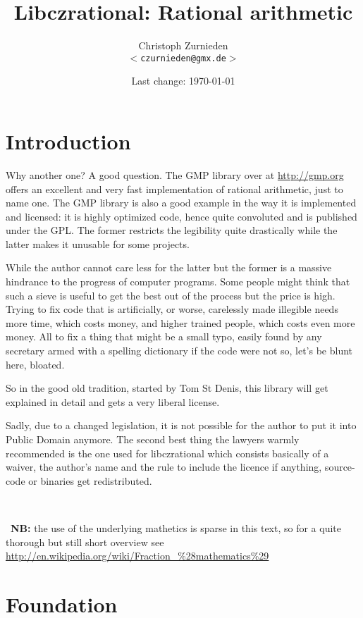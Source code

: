 \documentclass[10pt]{book}
\theoremstyle{definition}
\theoremstyle{remark}
\newcommand{\notabene}[1]{\
\begin{center}\
\begin{minipage}[t]{.9\linewidth}\
{\bfseries{NB:} }#1\
\end{minipage}
\end{center}
}
\begin{document}
\title{Libczrational: Rational arithmetic}
\author{Christoph Zurnieden\\
        \small{\texttt{$<$czurnieden@gmx.de$>$}}}
\date{Last change: \today}
\maketitle
\lstset{language=C,frame=lines}
\tableofcontents
\chapter*{Introduction}
Why another one? A good question. The GMP library over at \url{http://gmp.org}
offers an excellent and very fast implementation of rational arithmetic, just to
name one. The GMP library is also a good example in the way it is implemented
and licensed: it is highly optimized code, hence quite convoluted and is
published under the GPL. The former restricts the legibility quite
drastically while the latter makes it unusable for some projects.

While the author cannot care less for the latter but the former is a massive
hindrance to the progress of computer programs. Some people might think that
such a sieve is useful to get the best out of the process but the price is high.
Trying to fix code that is artificially, or worse, carelessly made illegible
needs more time, which costs money, and  higher trained people, which costs
even more money. All to fix a thing that might be a small typo, easily found
by any secretary armed with a spelling dictionary if the code were not so, let's
be blunt here, bloated.

So in the good old tradition, started by Tom St Denis, this library will get
explained in detail and gets a very liberal license.

Sadly, due to a changed legislation, it is not possible for the author to put
it into Public Domain anymore. The second best thing the lawyers warmly
recommended is the one used for libczrational which consists basically of
a waiver, the author's name and the rule to include the licence if anything,
source-code or binaries get redistributed.
\notabene{the use of the underlying mathetics is sparse in this text, so for a quite
thorough but still short overview see
\url{http://en.wikipedia.org/wiki/Fraction_\%28mathematics\%29} }

\chapter{Foundation}
\end{document}
